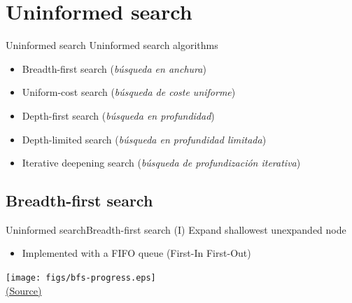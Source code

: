 \documentclass[10pt,compress]{beamer} %
\begin{document}
\section{Uninformed search}

\begin{frame}{Uninformed search}
    Uninformed search algorithms
    \begin{itemize}
        \item Breadth-first search (\textit{búsqueda en anchura})
        \item Uniform-cost search (\textit{búsqueda de coste uniforme})
        \item Depth-first search (\textit{búsqueda en profundidad})
        \item Depth-limited search (\textit{búsqueda en profundidad limitada})
        \item Iterative deepening search (\textit{búsqueda de profundización iterativa})
    \end{itemize}
\end{frame}

\subsection{Breadth-first search}

\begin{frame}{Uninformed search}{Breadth-first search (I)}
      Expand shallowest unexpanded node
      \begin{itemize}
        \item Implemented with a FIFO queue (First-In First-Out)
      \end{itemize}

      \bigskip 

      \begin{center}
          \texttt{[image: figs/bfs-progress.eps]}\\
          \tiny{\href{http://aima.cs.berkeley.edu/index.html}{(Source)}}
      \end{center}
\end{frame}
\end{document}
